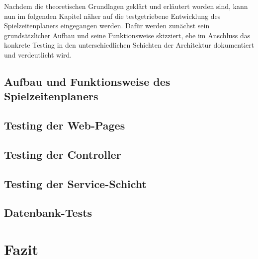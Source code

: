 Nachdem die theoretischen Grundlagen geklärt und erläutert worden sind, kann nun 
im folgenden Kapitel näher auf die testgetriebene Entwicklung des 
Spielzeitenplaners eingegangen werden. Dafür werden zunächst sein grundsätzlicher 
Aufbau und seine Funktionsweise skizziert, ehe im Anschluss das konkrete Testing 
in den unterschiedlichen Schichten der Architektur dokumentiert und verdeutlicht 
wird. 


\subsection{Aufbau und Funktionsweise des Spielzeitenplaners}




\subsection{Testing der Web-Pages}




\subsection{Testing der Controller}




\subsection{Testing der Service-Schicht}




\subsection{Datenbank-Tests}




\section{Fazit}



